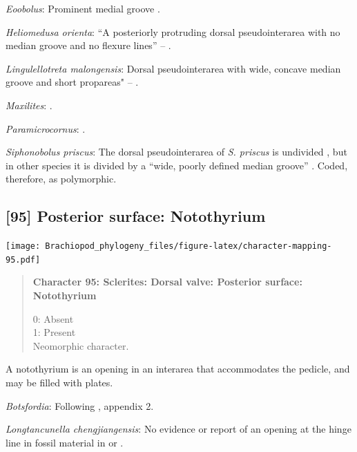 \documentclass[openany]{book}
\begin{document}
\hypertarget{Eoobolus-coding-94}{}
\emph{Eoobolus}: Prominent medial groove
\citep{Balthasar2009Thebrachiopod}.

\hypertarget{Heliomedusa_orienta-coding-94}{}
\emph{Heliomedusa orienta}: ``A posteriorly protruding dorsal
pseudointerarea with no median groove and no flexure lines'' --
\citet{Chen2007Reinterpretationof}.

\hypertarget{Lingulellotreta_malongensis-coding-94}{}
\emph{Lingulellotreta malongensis}: Dorsal pseudointerarea with wide,
concave median groove and short propareas" --
\citet{Williams2000LinguliformeaCraniiformea}.

\hypertarget{Maxilites-coding-94}{}
\emph{Maxilites}: \citet{Marek1972}.

\hypertarget{Paramicrocornus-coding-94}{}
\emph{Paramicrocornus}: \citet{Zhang2018Ahyolithid}.

\hypertarget{Siphonobolus_priscus-coding-94}{}
\emph{Siphonobolus priscus}: The dorsal pseudointerarea of \emph{S.
priscus} is undivided \citep{Popov2009Earlyontogeny}, but in other
species it is divided by a ``wide, poorly defined median groove''
\citep{Williams2000LinguliformeaCraniiformea}. Coded, therefore, as
polymorphic.

\subsection*{{[}95{]} Posterior surface:
Notothyrium}\label{posterior-surface-notothyrium}

\texttt{[image: Brachiopod\_phylogeny\_files/figure-latex/character-mapping-95.pdf]}

\begin{quote}
\textbf{Character 95: Sclerites: Dorsal valve: Posterior surface:
Notothyrium}

0: Absent\\
1: Present\\
Neomorphic character.
\end{quote}

A notothyrium is an opening in an interarea that accommodates the
pedicle, and may be filled with plates.

\hypertarget{Botsfordia-coding-95}{}
\emph{Botsfordia}: Following \citet{Williams1998Thediversity}, appendix
2.

\hypertarget{Longtancunella_chengjiangensis-coding-95}{}
\emph{Longtancunella chengjiangensis}: No evidence or report of an
opening at the hinge line in fossil material in
\citet{Zhang2007Agregarious} or \citet{Zhang2011Theexceptionally}.
\end{document}
